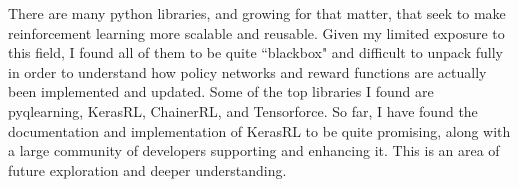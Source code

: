 \documentclass[a4paper,10pt]{extarticle}
\begin{document}
\begin{multicols}{2}
                        There are many python libraries, and growing for that matter, that seek to make reinforcement learning more scalable and reusable. Given my limited exposure to this field, I found all of them to be quite ``blackbox" and difficult to unpack fully in order to understand how policy networks and reward functions are actually been implemented and updated. Some of the top libraries I found are pyqlearning, KerasRL, ChainerRL, and Tensorforce. So far, I have found the documentation and implementation of KerasRL to be quite promising, along with a large community of developers supporting and enhancing it. This is an area of future exploration and deeper understanding. 

                        \smallskip


                        \end{multicols}
\end{document}
